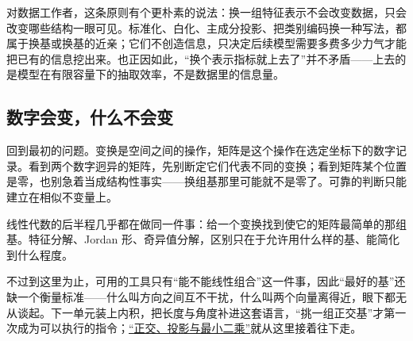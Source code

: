 对数据工作者，这条原则有个更朴素的说法：换一组特征表示不会改变数据，只会改变哪些结构一眼可见。标准化、白化、主成分投影、把类别编码换一种写法，都属于换基或换基的近亲；它们不创造信息，只决定后续模型需要多费多少力气才能把已有的信息挖出来。也正因如此，``换个表示指标就上去了''并不矛盾——上去的是模型在有限容量下的抽取效率，不是数据里的信息量。

\subsection{数字会变，什么不会变}

回到最初的问题。变换是空间之间的操作，矩阵是这个操作在选定坐标下的数字记录。看到两个数字迥异的矩阵，先别断定它们代表不同的变换；看到矩阵某个位置是零，也别急着当成结构性事实——换组基那里可能就不是零了。可靠的判断只能建立在相似不变量上。

线性代数的后半程几乎都在做同一件事：给一个变换找到使它的矩阵最简单的那组基。特征分解、Jordan 形、奇异值分解，区别只在于允许用什么样的基、能简化到什么程度。

不过到这里为止，可用的工具只有``能不能线性组合''这一件事，因此``最好的基''还缺一个衡量标准——什么叫方向之间互不干扰，什么叫两个向量离得近，眼下都无从谈起。下一单元装上内积，把长度与角度补进这套语言，``挑一组正交基''才第一次成为可以执行的指令；\hyperref[ch:018]{``正交、投影与最小二乘''}就从这里接着往下走。
